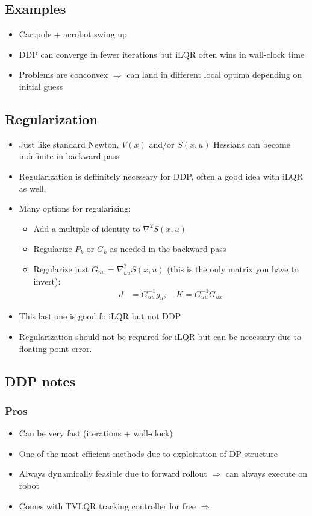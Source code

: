 \documentclass[11pt]{article}
\begin{document}
\subsection{Examples}
\begin{itemize}
    \item Cartpole + acrobot swing up
    \item DDP can converge in fewer iterations but iLQR often wins in wall-clock time
    \item Problems are conconvex $\Rightarrow$ can land in different local optima depending on initial guess
\end{itemize}

\subsection{Regularization}
\begin{itemize}
    \item Just like standard Newton, $V(x)$ and/or $S(x,u)$ Hessians can become indefinite in backward pass
    \item Regularization is deffinitely necessary for DDP, often a good idea with iLQR as well.
    \item Many options for regularizing:
    \begin{itemize}
        \item Add a multiple of identity to $\nabla^2 S(x,u)$
        \item Regularize $P_k$ or $G_k$ as needed in the backward pass
        \item Regularize just $G_{uu} = \nabla_{uu}^2S(x,u)$ (this is the only matrix you have to invert):
        \begin{align*}
            d &= G_{uu}^{-1}g_u, \quad K = G_{uu}^{-1}G_{ux}
        \end{align*}
    \end{itemize}
    \item This last one is good fo iLQR but not DDP
    \item Regularization should not be required for iLQR but can be necessary due to floating point error.
\end{itemize}
\subsection{DDP notes}
\subsubsection{Pros}
\begin{itemize}
    \item Can be very fast (iterations + wall-clock)
    \item One of the most efficient methods due to exploitation of DP structure
    \item Always dynamically feasible due to forward rollout $\Rightarrow$ can always execute on robot
    \item Comes with TVLQR tracking controller for free $\Rightarrow$ 
\end{itemize}
\end{document}
